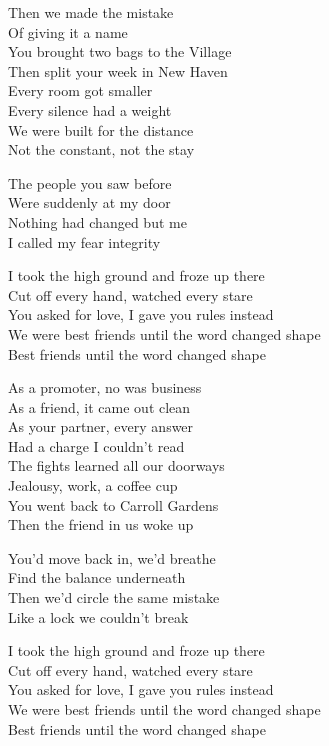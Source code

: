 \begin{lyrics}
Then we made the mistake\\
Of giving it a name\\
You brought two bags to the Village\\
Then split your week in New Haven\\
Every room got smaller\\
Every silence had a weight\\
We were built for the distance\\
Not the constant, not the stay

The people you saw before\\
Were suddenly at my door\\
Nothing had changed but me\\
I called my fear integrity

I took the high ground and froze up there\\
Cut off every hand, watched every stare\\
You asked for love, I gave you rules instead\\
We were best friends until the word changed shape\\
Best friends until the word changed shape

As a promoter, no was business\\
As a friend, it came out clean\\
As your partner, every answer\\
Had a charge I couldn't read\\
The fights learned all our doorways\\
Jealousy, work, a coffee cup\\
You went back to Carroll Gardens\\
Then the friend in us woke up

You'd move back in, we'd breathe\\
Find the balance underneath\\
Then we'd circle the same mistake\\
Like a lock we couldn't break

I took the high ground and froze up there\\
Cut off every hand, watched every stare\\
You asked for love, I gave you rules instead\\
We were best friends until the word changed shape\\
Best friends until the word changed shape


\end{lyrics}
